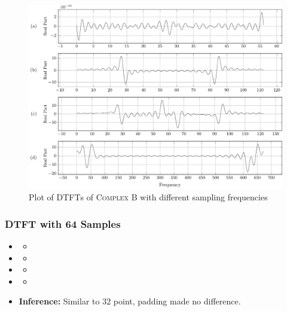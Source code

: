\documentclass[../../course]{subfiles}
\begin{document}
\begin{figure} [H]
    \centering
     {
        \includegraphics[height = 0.8\textheight] {tikzpics/plotDtftComplexB32.pdf}
    }
     {Plot of \textsc{DTFT}s of \textsc{Complex B} with different sampling frequencies}
    \label{plt:dtftComplexB}
\end{figure}

\subsubsection{DTFT with 64 Samples}

\begin{itemize} [label=]

    \item \sampFreqMuchLess
        \begin{itemize} [label=]
            \item
        \end{itemize}

    \item \sampFreqNorm
        \begin{itemize} [label=]
            \item
        \end{itemize}

    \item \sampFreqSligGreat
        \begin{itemize} [label=]
            \item
        \end{itemize}

    \item \sampFreqMuchGreat
        \begin{itemize} [label=]
            \item
        \end{itemize}

    \item \textbf{Inference:} Similar to $32$ point, padding made no difference.

\end{itemize}
\end{document}
